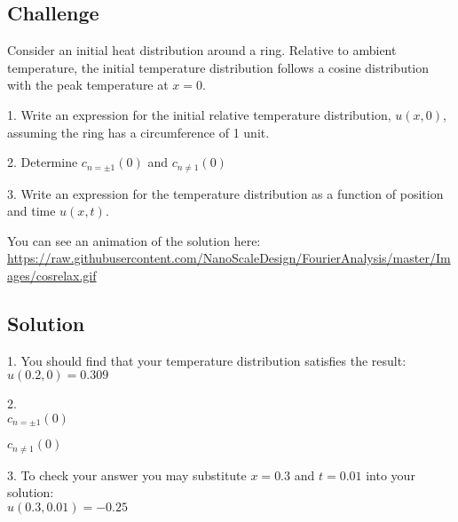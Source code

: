 \subsection*{Challenge}
Consider an initial heat distribution around a ring. Relative to ambient temperature, the initial temperature distribution follows a cosine distribution with the peak temperature at $x=0$.

1. Write an expression for the initial relative temperature distribution, $u(x,0)$, assuming the ring has a circumference of 1 unit.

2. Determine $c_{n=\pm 1}(0)$ and $c_{n \ne 1}(0)$

3. Write an expression for the temperature distribution as a function of position and time $u(x,t)$.

You can see an animation of the solution here:\\
\url{https://raw.githubusercontent.com/NanoScaleDesign/FourierAnalysis/master/Images/cosrelax.gif}

\subsection*{Solution}
1. You should find that your temperature distribution satisfies the result:\\
$u(0.2,0) = 0.309$

2.\\
$c_{n=\pm 1}(0)$\\

$c_{n \ne 1}(0)$\\

3. To check your answer you may substitute $x=0.3$ and $t=0.01$ into your solution:\\
$u(0.3,0.01) = -0.25$
\fi

